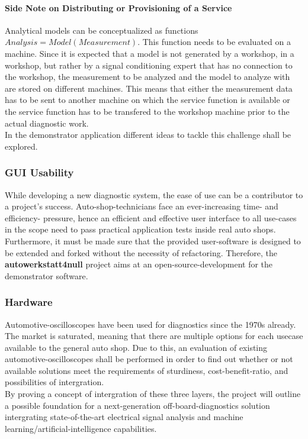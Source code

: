 \paragraph{Side Note on Distributing or Provisioning of a Service}
Analytical models can be conceptualized as functions $Analysis = Model(Measurement)$.
This function needs to be evaluated on a machine.
Since it is expected that a model is not generated by a workshop, in a workshop, but rather by a signal conditioning expert that has no connection to the workshop, the measurement to be analyzed and the model to analyze with are stored on different machines.
This means that either the measurement data has to be sent to another machine on which the service function is available or the service function has to be transfered to the workshop machine prior to the actual diagnostic work. \hfill \\
In the demonstrator application different ideas to tackle this challenge shall be explored. 

\subsubsection{GUI Usability}
While developing a new diagnostic system, the ease of use can be a contributor to a project's success.
Auto-shop-technicians face an ever-increasing time- and efficiency- pressure, hence an efficient and effective user interface to all use-cases in the scope need to pass practical application tests inside real auto shops.
Furthermore, it must be made sure that the provided user-software is designed to be extended and forked without the necessity of refactoring.
Therefore, the \textbf{autowerkstatt4null} project aims at an open-source-development for the demonstrator software.

\subsubsection{Hardware}
Automotive-oscilloscopes have been used for diagnostics since the 1970s already.
The market is saturated, meaning that there are multiple options for each usecase available to the general auto shop.
Due to this, an evaluation of existing automotive-oscilloscopes shall be performed in order to find out whether or not available solutions meet the requirements of sturdiness, cost-benefit-ratio, and possibilities of intergration. \\

By proving a concept of intergration of these three layers, the project will outline a possible foundation for a next-generation off-board-diagnostics solution intergrating state-of-the-art electrical signal analysis and machine learning/artificial-intelligence capabilities.


